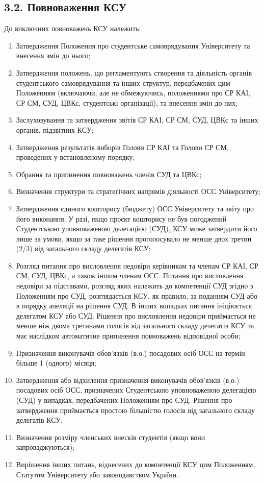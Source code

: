 \subsection*{3.2. Повноваження КСУ}
    До виключних повноважень КСУ належить:
        \begin{enumerate}[label=\alph*)]
            \item Затвердження Положення про студентське самоврядування Університету та внесення змін до нього;
            \item Затвердження положень, що регламентують створення та діяльність органів студентського самоврядування та інших структур, передбачених цим Положенням (включаючи, але не обмежуючись, положеннями про СР КАІ, СР СМ, СУД, ЦВКс, студентські організації), та внесення змін до них;
            \item Заслуховування та затвердження звітів СР КАІ, СР СМ, СУД, ЦВКс та інших органів, підзвітних КСУ;
            \item Затвердження результатів виборів Голови СР КАІ та Голови СР СМ, проведених у встановленому порядку;
            \item Обрання та припинення повноважень членів СУД та ЦВКс;
            \item Визначення структури та стратегічних напрямів діяльності ОСС Університету;
            \item Затвердження єдиного кошторису (бюджету) ОСС Університету та звіту про його виконання. У разі, якщо проєкт кошторису не був погоджений Студентською уповноваженою делегацією (СУД), КСУ може затвердити його лише за умови, якщо за таке рішення проголосувало не менше двох третин (2/3) від загального складу делегатів КСУ;
            \item Розгляд питання про висловлення недовіри керівникам та членам СР КАІ, СР СМ, СУД, ЦВКс, а також іншим членам ОСС. Питання про висловлення недовіри за підставами, розгляд яких належить до компетенції СУД згідно з Положенням про СУД, розглядається КСУ, як правило, за поданням СУД або в порядку апеляції на рішення СУД. В інших випадках питання ініціюється делегатом КСУ або СУД. Рішення про висловлення недовіри приймається не менше ніж двома третинами голосів від загального складу делегатів КСУ та має наслідком автоматичне припинення повноважень відповідної особи;
            \item Призначення виконувачів обов'язків (в.о.) посадових осіб ОСС на термін більше 1 (одного) місяця;
            \item Затвердження або відхилення призначення виконувачів обов'язків (в.о.) посадових осіб ОСС, призначених Студентською уповноваженою делегацією (СУД) у випадках, передбачених Положенням про СУД. Рішення про затвердження приймається простою більшістю голосів від загального складу делегатів КСУ;
            \item Визначення розміру членських внесків студентів (якщо вони запроваджуються);
            \item Вирішення інших питань, віднесених до компетенції КСУ цим Положенням, Статутом Університету або законодавством України.
        \end{enumerate}

